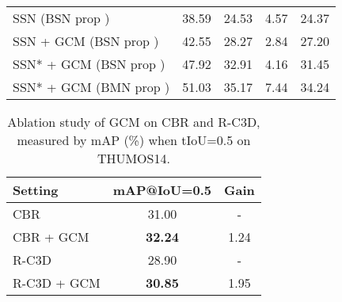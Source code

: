 \documentclass[10pt,journal,compsoc]{IEEEtran}
\begin{document}
\begin{table}[!t]
\begin{tabular}{lccc|c}
			SSN (BSN prop \cite{lin2018bsn})     & 38.59   & 24.53  & 4.57 & 24.37  \\ 	
			SSN  + GCM  (BSN prop \cite{lin2018bsn})             & 42.55         & 28.27 & 2.84 & 27.20  \\ 
			SSN* + GCM (BSN prop \cite{lin2018bsn})  & 47.92  & 32.91 & 4.16 & 31.45 \\
			SSN*  + GCM (BMN prop \cite{lin2019bmn})  & 51.03  & 35.17 & 7.44 & 34.24 \\
			\hline
		\end{tabular}
		\label{Tab:anet}
	\end{table}
	
	
	
		\begin{table}[!tb]
		\centering
		\caption{Ablation study of GCM on CBR and R-C3D, measured by mAP (\%) when tIoU=0.5 on THUMOS14.}
		\begin{tabular}{l|cc}
			\hline
			Setting                & mAP@IoU=0.5     & Gain            \\ \hline
			CBR~\cite{gao2017cascaded}        & 31.00      &  -     \\
			CBR + GCM    & \textbf{32.24}    & 1.24   \\ \hline 
			R-C3D~\cite{xu2017r}  & 28.90   & -        \\
			R-C3D + GCM   & \textbf{30.85}   & 1.95 \\ \hline
		\end{tabular}
		\label{Tab:cbr}
	\end{table} 
\end{document}
